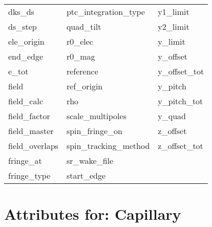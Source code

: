 \begin{tabular}{lll}
dks_ds                      & ptc_integration_type        & y1_limit                    \\
ds_step                     & quad_tilt                   & y2_limit                    \\
ele_origin                  & r0_elec                     & y_limit                     \\
end_edge                    & r0_mag                      & y_offset                    \\
e_tot                       & reference                   & y_offset_tot                \\
field                       & ref_origin                  & y_pitch                     \\
field_calc                  & rho                         & y_pitch_tot                 \\
field_factor                & scale_multipoles            & y_quad                      \\
field_master                & spin_fringe_on              & z_offset                    \\
field_overlaps              & spin_tracking_method        & z_offset_tot                \\
fringe_at                   & sr_wake_file                &                             \\
fringe_type                 & start_edge                  &                             \\
 \bottomrule
 \end{tabular}
 \vfill
 
 \section{Attributes for: Capillary}
 \label{s:list.capillary}
 
